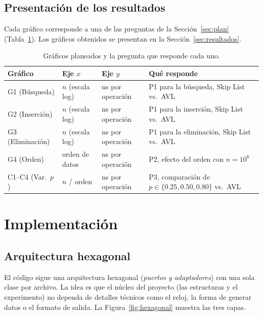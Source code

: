 \documentclass[11pt,a4paper]{article}
\begin{document}
\subsection{Presentación de los resultados}

Cada gráfico corresponde a una de las preguntas de la Sección~\ref{sec:plan}
(Tabla~\ref{tab:graficos}). Los gráficos obtenidos se presentan en la
Sección~\ref{sec:resultados}.

\begin{table}[!htb]
\centering
\renewcommand{\arraystretch}{1.2}
\begin{tabularx}{\textwidth}{l l l X}
\toprule
\textbf{Gráfico} & \textbf{Eje $x$} & \textbf{Eje $y$} & \textbf{Qué responde} \\
\midrule
G1 (Búsqueda)    & $n$ (escala log) & ns por operación & P1 para la búsqueda, Skip List vs.\ AVL \\
G2 (Inserción)   & $n$ (escala log) & ns por operación & P1 para la inserción, Skip List vs.\ AVL \\
G3 (Eliminación) & $n$ (escala log) & ns por operación & P1 para la eliminación, Skip List vs.\ AVL \\
G4 (Orden)       & orden de datos   & ns por operación & P2, efecto del orden con $n = 10^6$ \\
C1--C4 (Var.\ $p$) & $n$ / orden      & ns por operación & P3, comparación de $p \in \{0.25, 0.50, 0.80\}$ vs.\ AVL \\
\bottomrule
\end{tabularx}
\caption{Gráficos planeados y la pregunta que responde cada uno.}
\label{tab:graficos}
\end{table}

\section{Implementación}\label{sec:impl}

\subsection{Arquitectura hexagonal}

El código sigue una arquitectura hexagonal (\emph{puertos y adaptadores}) con
una sola clase por archivo. La idea es que el núcleo del proyecto (las
estructuras y el experimento) no dependa de detalles técnicos como el reloj,
la forma de generar datos o el formato de salida. La
Figura~\ref{fig:hexagonal} muestra las tres capas.
\end{document}
